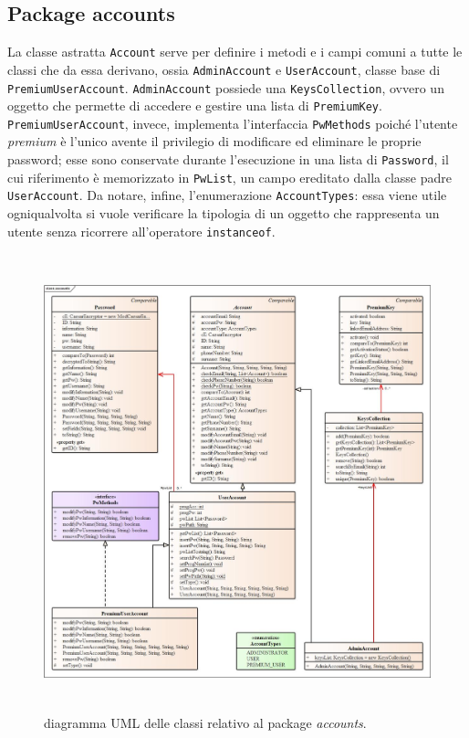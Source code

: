 \documentclass[a4paper, 12pt, one column, aas_macros]{article}
\begin{document}
	\subsection{Package accounts}
	La classe astratta \verb|Account| serve per definire i metodi e i campi comuni a tutte le classi che da essa derivano, ossia \verb|AdminAccount| e \verb|UserAccount|, classe base di \verb|PremiumUserAccount|. \verb|AdminAccount| possiede una \verb|KeysCollection|, ovvero un oggetto che permette di accedere e gestire una lista di \verb|PremiumKey|. \verb|PremiumUserAccount|, invece, implementa l'interfaccia \verb|PwMethods| poiché l'utente \textit{premium} è l'unico avente il privilegio di modificare ed eliminare le proprie password; esse sono conservate durante l'esecuzione in una lista di \verb|Password|, il cui riferimento è memorizzato in \verb|PwList|, un campo ereditato dalla classe padre \verb|UserAccount|. Da notare, infine, l'enumerazione \verb|AccountTypes|: essa viene utile ogniqualvolta si vuole verificare la tipologia di un oggetto che rappresenta un utente senza ricorrere all'operatore \verb|instanceof|.
	\begin{figure}[h!]
		\centering
		\includegraphics[height=500px]{UML/accounts.jpg}
		\caption{diagramma UML delle classi relativo al package \textit{accounts}.}
		\label{UML_accounts}
	\end{figure}
	
\end{document}
